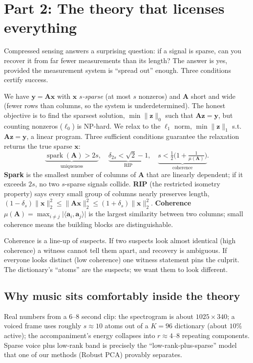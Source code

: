 \documentclass[11pt]{article}
\newcommand{\norm}[1]{\lVert#1\rVert}
\DeclareMathOperator{\spark}{spark}
\begin{document}
\section{Part 2: The theory that licenses everything}

Compressed sensing answers a surprising question: if a signal is sparse, can you
recover it from far fewer measurements than its length? The answer is yes, provided
the measurement system is ``spread out'' enough. Three conditions certify success.

\begin{slowmath}
We have $\bm y=\bm A\bm x$ with $\bm x$ \emph{$s$-sparse} (at most $s$ nonzeros) and
$\bm A$ short and wide (fewer rows than columns, so the system is
underdetermined). The honest objective is to find the sparsest solution,
$\min\norm{\bm z}_0$ such that $\bm A\bm z=\bm y$, but counting nonzeros
($\ell_0$) is NP-hard. We relax to the $\ell_1$ norm,
$\min\norm{\bm z}_1$ s.t.\ $\bm A\bm z=\bm y$, a linear program. Three sufficient
conditions guarantee the relaxation returns the true sparse $\bm x$:
\[
\underbrace{\spark(\bm A)>2s}_{\text{uniqueness}},\quad
\underbrace{\delta_{2s}<\sqrt2-1}_{\text{RIP}},\quad
\underbrace{s<\tfrac12\big(1+\tfrac1{\mu(\bm A)}\big)}_{\text{coherence}}.
\]
\textbf{Spark} is the smallest number of columns of $\bm A$ that are linearly
dependent; if it exceeds $2s$, no two $s$-sparse signals collide. \textbf{RIP} (the
restricted isometry property) says every small group of columns nearly preserves
length, $(1-\delta_s)\norm{\bm x}_2^2\le\norm{\bm A\bm x}_2^2\le(1+\delta_s)\norm{\bm x}_2^2$.
\textbf{Coherence} $\mu(\bm A)=\max_{i\ne j}\lvert\langle\bm a_i,\bm a_j\rangle\rvert$
is the largest similarity between two columns; small coherence means the building
blocks are distinguishable.
\end{slowmath}

\begin{analogy}
Coherence is a line-up of suspects. If two suspects look almost identical (high
coherence) a witness cannot tell them apart, and recovery is ambiguous. If everyone
looks distinct (low coherence) one witness statement pins the culprit. The
dictionary's ``atoms'' are the suspects; we want them to look different.
\end{analogy}

\subsection{Why music sits comfortably inside the theory}
Real numbers from a 6--8 second clip: the spectrogram is about $1025\times340$;
a voiced frame uses roughly $s\approx10$ atoms out of a $K=96$ dictionary (about
$10\%$ active); the accompaniment's energy collapses into $r\approx4$--$8$
repeating components. Sparse voice plus low-rank band is precisely the
``low-rank-plus-sparse'' model that one of our methods (Robust PCA) provably
separates.
\end{document}
